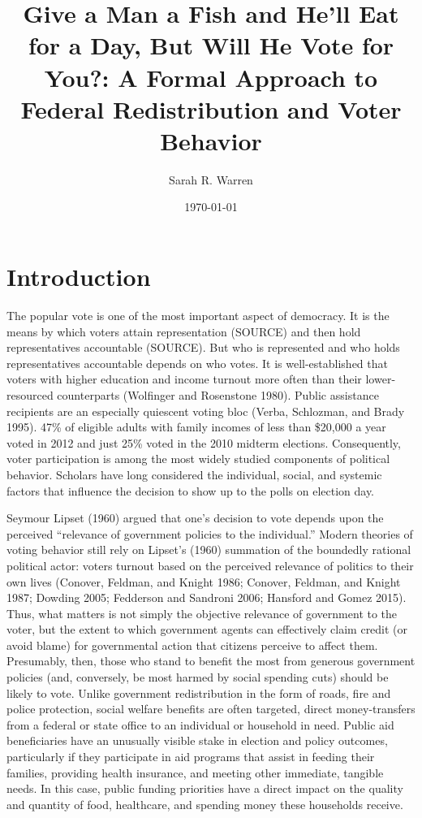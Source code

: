 \documentclass[12pt]{paper}
\begin{document}
\title{Give a Man a Fish and He'll Eat for a Day, But Will He Vote for You?: A Formal Approach to Federal Redistribution and Voter Behavior}
\author{Sarah R. Warren}
\date{\today}
\maketitle



\section{Introduction}
The popular vote is one of the most important aspect of democracy. It is the means by which voters attain representation (SOURCE) and then hold representatives accountable (SOURCE). But who is represented and who holds representatives accountable depends on who votes. It is well-established that voters with higher education and income turnout more often than their lower-resourced counterparts (Wolfinger and Rosenstone 1980). Public assistance recipients are an especially quiescent voting bloc (Verba, Schlozman, and Brady 1995). 47\% of eligible adults with family incomes of less than \$20,000 a year voted in 2012 and just 25\% voted in the 2010 midterm elections. Consequently, voter participation is among the most widely studied components of political behavior. Scholars have long considered the individual, social, and systemic factors that influence the decision to show up to the polls on election day. 

Seymour Lipset (1960) argued that one's decision to vote depends upon the perceived “relevance of government policies to the individual.” Modern theories of voting behavior still rely on Lipset’s (1960) summation of the boundedly rational political actor: voters turnout based on the perceived relevance of politics to their own lives (Conover, Feldman, and Knight 1986; Conover, Feldman, and Knight 1987; Dowding 2005; Fedderson and Sandroni 2006; Hansford and Gomez 2015). Thus, what matters is not simply the objective relevance of government to the voter, but the extent to which government agents can effectively claim credit (or avoid blame) for governmental action that citizens perceive to affect them. Presumably, then, those who stand to benefit the most from generous government policies (and, conversely, be most harmed by social spending cuts) should be likely to vote. Unlike government redistribution in the form of roads, fire and police protection, social welfare benefits are often targeted, direct money-transfers from a federal or state office to an individual or household in need. Public aid beneficiaries have an unusually visible stake in election and policy outcomes, particularly if they participate in aid programs that assist in feeding their families, providing health insurance, and meeting other immediate, tangible needs. In this case, public funding priorities have a direct impact on the quality and quantity of food, healthcare, and spending money these households receive.
\end{document}

